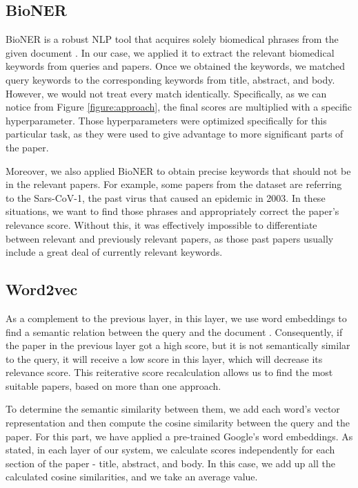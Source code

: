 \documentclass[10pt, a4paper]{article}
\begin{document}
	\subsection{BioNER}
	
	BioNER is a robust NLP tool that acquires solely biomedical phrases from the given document \citep{wang2019cross}.  In our case, we applied it to extract the relevant biomedical keywords from queries and papers.  Once we obtained the keywords, we matched query keywords to the corresponding keywords from title, abstract, and body. However, we would not treat every match identically. Specifically, as we can notice from Figure \ref{figure:approach}, the final scores are multiplied with a specific hyperparameter.  Those hyperparameters were optimized specifically for this particular task, as they were used to give advantage to more significant parts of the paper.
	
	Moreover, we also applied BioNER to obtain precise keywords that should not be in the relevant papers. For example, some papers from the dataset are referring to the Sars-CoV-1, the past virus that caused an epidemic in 2003. In these situations, we want to find those phrases and appropriately correct the paper's relevance score. Without this, it was effectively impossible to differentiate between relevant and previously relevant papers, as those past papers usually include a great deal of currently relevant keywords.
	
	\subsection{Word2vec}
	
	As a complement to the previous layer, in this layer, we use word embeddings to find a semantic relation between the query and the document \cite{mikolov2013distributed}. Consequently, if the paper in the previous layer got a high score, but it is not semantically similar to the query, it will receive a low score in this layer, which will decrease its relevance score. This reiterative score recalculation allows us to find the most suitable papers, based on more than one approach.
	
	To determine the semantic similarity between them, we add each word's vector representation and then compute the cosine similarity between the query and the paper. For this part, we have applied a pre-trained Google's word embeddings. As stated, in each layer of our system, we calculate scores independently for each section of the paper - title, abstract, and body. In this case, we add up all the calculated cosine similarities, and we take an average value. 
	
\end{document}

